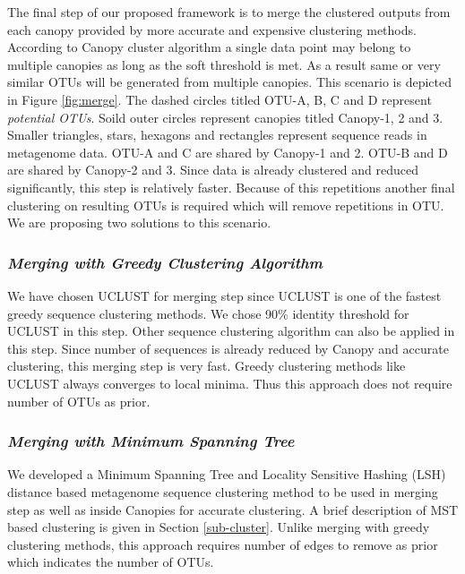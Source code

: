 \documentclass[10pt, conference, compsocconf]{IEEEtran}
\begin{document}
The final step of our proposed framework is to merge the clustered outputs from each canopy provided by more accurate and expensive clustering methods. According to Canopy cluster algorithm a single data point may belong to multiple canopies as long as the soft threshold is met. As a result same or very similar OTUs will be generated from multiple canopies. This scenario is depicted in Figure \ref{fig:merge}. The dashed circles titled OTU-A, B, C and D represent \textit{potential OTUs}. Soild outer circles represent canopies titled Canopy-1, 2 and 3. Smaller triangles, stars, hexagons and rectangles represent sequence reads in metagenome data. OTU-A and C are shared by Canopy-1 and 2. OTU-B and D are shared by Canopy-2 and 3. Since data is already clustered and reduced significantly, this step is relatively faster. Because of this repetitions another final clustering on resulting OTUs is required which will remove repetitions in OTU. We are proposing two solutions to this scenario.

\subsubsection{\textit{Merging with Greedy Clustering Algorithm}}
We have chosen UCLUST for merging step since UCLUST is one of the fastest greedy sequence clustering methods. We chose 90\% identity threshold for UCLUST in this step. Other sequence clustering algorithm can also be applied in this step. Since number of sequences is already reduced by Canopy and accurate clustering, this merging step is very fast. Greedy clustering methods like UCLUST always converges to local minima. Thus this approach does not require number of OTUs as prior. 

\subsubsection{\textit{Merging with Minimum Spanning Tree}}
\label{MST}
We developed a Minimum Spanning Tree and Locality Sensitive Hashing (LSH) distance based metagenome sequence clustering method to be used in merging step as well as inside Canopies for accurate clustering. A brief description of MST based clustering is given in Section \ref{sub-cluster}. Unlike merging with greedy clustering methods, this approach requires number of edges to remove as prior which indicates the number of OTUs.    
\end{document}
